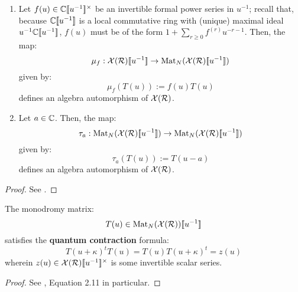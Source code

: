         \begin{lemma} \label{lemma: automorphisms_of_extended_untwisted_yangians}
            \begin{enumerate}
                \item Let $f(u) \in \bbC[\![u^{-1}]\!]^{\x}$ be an invertible formal power series in $u^{-1}$; recall that, because $\mathbb{C}[\![u^{-1}]\!]$ is a local commutative ring with (unique) maximal ideal $u^{-1}\mathbb{C}[\![u^{-1}]\!]$, $f(u)$ must be of the form $1 + \sum_{r \geq 0} f^{(r)} u^{-r - 1}$. Then, the map:
                    $$\mu_f: \mathcal{X}(\mathcal{R})[\![u^{-1}]\!] \to \operatorname{Mat}_N(\mathcal{X}(\mathcal{R})[\![u^{-1}]\!])$$
                given by:
                    $$\mu_f( T(u) ) := f(u) T(u)$$
                defines an algebra automorphism of $\mathcal{X}(\mathcal{R})$.
                \item Let $a \in \mathbb{C}$. Then, the map:
                    $$\tau_a: \operatorname{Mat}_N(\mathcal{X}(\mathcal{R})[\![u^{-1}]\!]) \to \operatorname{Mat}_N(\mathcal{X}(\mathcal{R})[\![u^{-1}]\!])$$
                given by:
                    $$\tau_a( T(u) ) := T(u - a)$$
                defines an algebra automorphism of $\mathcal{X}(\mathcal{R})$.
            \end{enumerate}
        \end{lemma}
            \begin{proof}
                See \cite[Section 2]{guay_regelskis_twisted_yangians_for_symmetric_pairs_of_types_BCD}.
            \end{proof}
    
        \begin{lemma} \label{lemma: quantum_contractions}
            The monodromy matrix:
                $$T(u) \in \operatorname{Mat}_N( \mathcal{X}(\mathcal{R}) )[\![u^{-1}]\!]$$
            satisfies the \textbf{quantum contraction} formula:
                \begin{equation} \label{equation: quantum_contraction}
                    T(u + \kappa)^t T(u) = T(u) T(u + \kappa)^t = z(u)
                \end{equation}
            wherein $z(u) \in \calX(\calR)[\![u^{-1}]\!]^{\x}$ is some invertible scalar series.
        \end{lemma}
            \begin{proof}
                See \cite[Section 2]{guay_regelskis_twisted_yangians_for_symmetric_pairs_of_types_BCD}, Equation 2.11 in particular.
            \end{proof}
            
